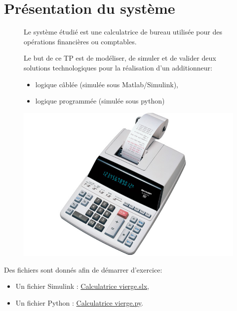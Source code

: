 

\section{Présentation du système}

\begin{figure}[ht!]
 \begin{minipage}{0.55\linewidth}
Le système étudié est une calculatrice de bureau utilisée pour des opérations financières ou comptables.

Le but de ce TP est de modéliser, de simuler et de valider deux solutions technologiques pour la réalisation d'un additionneur:
\begin{itemize}
 \item logique câblée (simulée sous Matlab/Simulink),
 \item logique programmée (simulée sous python)
\end{itemize}
 \end{minipage}
 \hfill
  \begin{minipage}{0.4\linewidth}
   \centering\includegraphics[width=0.7\linewidth]{img/calculatrice.png}
  \end{minipage}
\end{figure}

Des fichiers sont donnés afin de démarrer d'exercice:
\begin{itemize}
 \item Un fichier Simulink : \href{https://raw.githubusercontent.com/Costadoat/Sciences-Ingenieur/master/S07\%20Les\%20syst\%C3\%A8mes\%20\%C3\%A0\%20\%C3\%A9v\%C3\%A8nements\%20discrets/TP01\%20Fonctions\%20combinatoires/Ilot_01\%20Calculatrice\%20de\%20bureau/Code/Calculatrice\_vierge.slx}{Calculatrice vierge.slx},
 \item Un fichier Python : \href{https://raw.githubusercontent.com/Costadoat/Sciences-Ingenieur/master/S07\%20Les\%20syst\%C3\%A8mes\%20\%C3\%A0\%20\%C3\%A9v\%C3\%A8nements\%20discrets/TP01\%20Fonctions\%20combinatoires/Ilot_01\%20Calculatrice\%20de\%20bureau/Code/Calculatrice\_vierge.py}{Calculatrice vierge.py}.

\end{itemize}

